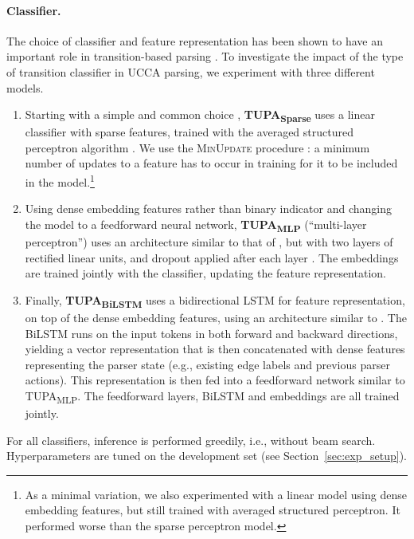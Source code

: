 \documentclass[11pt,a4paper]{article}
\newcommand{\parser}[1]{TUPA\textsubscript{#1}}
\newcommand{\secref}[1]{Section~\ref{#1}}
\begin{document}
\paragraph{Classifier.}
The choice of classifier and feature representation has been shown to have an important role in
transition-based parsing \cite{chen2014fast,andor2016globally,kiperwasser2016simple}.
To investigate the impact of the type of transition classifier in UCCA parsing,
we experiment with three different models.
\begin{enumerate}
\item
Starting with a simple and common choice \cite[e.g.,][]{maier-lichte:2016:DiscoNLP},
\textbf{\parser{Sparse}} uses a linear classifier with sparse features, trained with
the averaged structured perceptron algorithm
\cite{Coll:04}. We use the \textsc{MinUpdate} procedure \cite{goldberg2011learning}:
a minimum number of updates to a feature has to occur in training for it
to be included in the model.\footnote{As a minimal variation,
we also experimented with a linear model using
dense embedding features, but still trained with averaged structured perceptron.
It performed worse than the sparse perceptron model.}
\item
Using dense embedding features rather than binary indicator and
changing the model to a feedforward neural network, \textbf{\parser{MLP}}
(``multi-layer perceptron'') uses an architecture similar to that of \citet{chen2014fast},
but with two layers of rectified linear units,
and dropout applied after each layer \cite{srivastava2014dropout}.
The embeddings are trained jointly with the classifier,
updating the feature representation.
\item
Finally, \textbf{\parser{BiLSTM}} uses a bidirectional LSTM for feature representation,
on top of the dense embedding features,
using an architecture similar to \citet{kiperwasser2016simple}.
The BiLSTM runs on the input tokens in both forward and backward directions,
yielding a vector representation that is then concatenated with dense features representing the
parser state (e.g., existing edge labels and previous parser actions).
This representation is then fed into a feedforward network similar to \parser{MLP}.
The feedforward layers, BiLSTM and embeddings are all trained jointly.
\end{enumerate}

For all classifiers, inference is performed greedily, i.e., without beam search.
Hyperparameters are tuned on the development set (see \secref{sec:exp_setup}).
\end{document}
